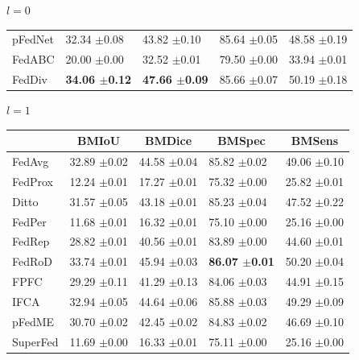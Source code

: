 \documentclass[journal]{IEEEtran}
\begin{document}
\begin{table}
\begin{subtable}[]{$l=0$}
\begin{tabular}{@{}lllll@{}}
			pFedNet              & 32.34 $\pm$0.08           & 43.82 $\pm$0.10            & 85.64 $\pm$0.05            & 48.58 $\pm$0.19            \\
			FedABC               & 20.00 $\pm$0.00           & 32.52 $\pm$0.01            & 79.50 $\pm$0.00            & 33.94 $\pm$0.01            \\
			FedDiv               & \textbf{34.06 $\pm$0.12}  & \textbf{47.66 $\pm$0.09}   & 85.66 $\pm$0.07            & 50.19 $\pm$0.18            \\ \bottomrule
		\end{tabular}
	\end{subtable}
	\centering
	\begin{subtable}[]{$l=1$}
		\begin{tabular}{@{}lllll@{}}
			\toprule
			\multicolumn{1}{c}{} & \multicolumn{1}{c}{BMIoU} & \multicolumn{1}{c}{BMDice} & \multicolumn{1}{c}{BMSpec} & \multicolumn{1}{c}{BMSens} \\ \midrule
			FedAvg   & 32.89 $\pm$0.02          & 44.58 $\pm$0.04          & 85.82 $\pm$0.02          & 49.06 $\pm$0.10          \\
			FedProx  & 12.24 $\pm$0.01          & 17.27 $\pm$0.01          & 75.32 $\pm$0.00          & 25.82 $\pm$0.01          \\
			Ditto    & 31.57 $\pm$0.05          & 43.18 $\pm$0.01          & 85.23 $\pm$0.04          & 47.52 $\pm$0.22          \\
			FedPer   & 11.68 $\pm$0.01          & 16.32 $\pm$0.01          & 75.10 $\pm$0.00          & 25.16 $\pm$0.00          \\
			FedRep   & 28.82 $\pm$0.01          & 40.56 $\pm$0.01          & 83.89 $\pm$0.00          & 44.60 $\pm$0.01          \\
			FedRoD   & 33.74 $\pm$0.01          & 45.94 $\pm$0.03          & \textbf{86.07 $\pm$0.01} & 50.20 $\pm$0.04          \\
			FPFC     & 29.29 $\pm$0.11          & 41.29 $\pm$0.13          & 84.06 $\pm$0.03          & 44.91 $\pm$0.15          \\
			IFCA     & 32.94 $\pm$0.05          & 44.64 $\pm$0.06          & 85.88 $\pm$0.03          & 49.29 $\pm$0.09          \\
			pFedME   & 30.70 $\pm$0.02          & 42.45 $\pm$0.02          & 84.83 $\pm$0.02          & 46.69 $\pm$0.10          \\
			SuperFed & 11.69 $\pm$0.00          & 16.33 $\pm$0.01          & 75.11 $\pm$0.00          & 25.16 $\pm$0.00          \\

\end{tabular}
\end{subtable}
\end{table}
\end{document}
